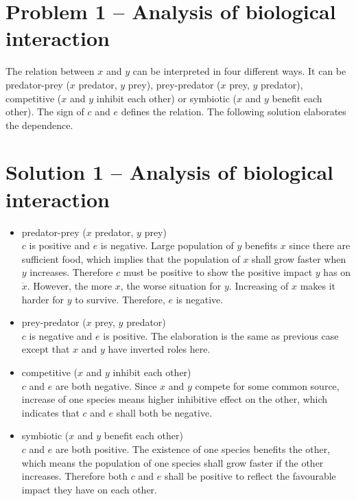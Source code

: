 \documentclass[a4paper,twocolumn]{article} %
\begin{document}
\section*{Problem 1 -- Analysis of biological interaction}
\label{sec:pro1}

The relation between $x$ and $y$ can be interpreted in four different ways. It can be predator-prey ($x$ predator, $y$ prey), prey-predator ($x$ prey, $y$ predator), competitive ($x$ and $y$ inhibit each other) or symbiotic ($x$ and $y$ benefit each other). The sign of $c$ and $e$ defines the relation. The following solution elaborates the dependence.    

\section*{Solution 1 -- Analysis of biological interaction}
\label{sec:sol1}

\begin{itemize}
  \item predator-prey ($x$ predator, $y$ prey)\\
  $c$ is positive and $e$ is negative. Large population of $y$ benefits $x$ since there are sufficient food, which implies that the population of $x$ shall grow faster when $y$ increases. Therefore $c$ must be positive to show the positive impact $y$ has on $\dot{x}$. However, the more $x$, the worse situation for $y$. Increasing of $x$ makes it harder for $y$ to survive. Therefore, $e$ is negative.
  \item prey-predator ($x$ prey, $y$ predator)\\
  $c$ is negative and $e$ is positive. The elaboration is the same as previous case except that $x$ and $y$ have inverted roles here.
  \item competitive ($x$ and $y$ inhibit each other)\\
  $c$ and $e$ are both negative. Since $x$ and $y$ compete for some common source, increase of one species means higher inhibitive effect on the other, which indicates that $c$ and $e$ shall both be negative.
  \item symbiotic ($x$ and $y$ benefit each other)\\
  $c$ and $e$ are both positive. The existence of one species benefits the other, which means the population of one species shall grow faster if the other increases. Therefore both $c$ and $e$ shall be positive to reflect the favourable impact they have on each other.
\end{itemize}
\end{document}
